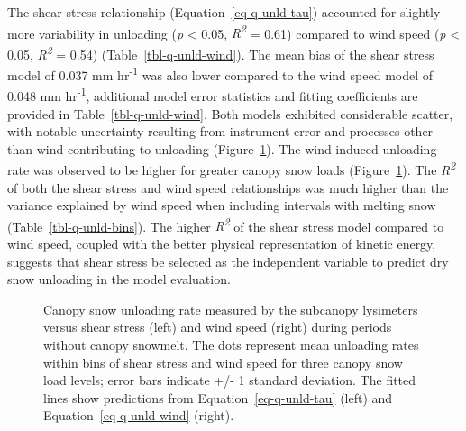 \documentclass[
]{agujournal2019}
\makeatletter
\newcommand*\pandocbounded[1]{%
  \sbox\pandoc@box{#1}%
  \Gscale@div\@tempa{\textheight}{\dimexpr\ht\pandoc@box+\dp\pandoc@box\relax}%
  \Gscale@div\@tempb{\linewidth}{\wd\pandoc@box}%
  \ifdim\@tempb\p@<\@tempa\p@\let\@tempa\@tempb\fi%
  \ifdim\@tempa\p@<\p@\scalebox{\@tempa}{\usebox\pandoc@box}%
  \else\usebox{\pandoc@box}%
  \fi%
}
\makeatother
\begin{document}
The shear stress relationship (Equation~\ref{eq-q-unld-tau}) accounted
for slightly more variability in unloading (\emph{p} \textless{} 0.05,
\emph{R\textsuperscript{2}} = 0.61) compared to wind speed (\emph{p}
\textless{} 0.05, \emph{R\textsuperscript{2}} = 0.54)
(Table~\ref{tbl-q-unld-wind}). The mean bias of the shear stress model
of 0.037 mm hr\textsuperscript{-1} was also lower compared to the wind
speed model of 0.048 mm hr\textsuperscript{-1}, additional model error
statistics and fitting coefficients are provided in
Table~\ref{tbl-q-unld-wind}. Both models exhibited considerable scatter,
with notable uncertainty resulting from instrument error and processes
other than wind contributing to unloading
(Figure~\ref{fig-q-unld-wind}). The wind-induced unloading rate was
observed to be higher for greater canopy snow loads
(Figure~\ref{fig-q-unld-wind}). The \emph{R\textsuperscript{2}} of both
the shear stress and wind speed relationships was much higher than the
variance explained by wind speed when including intervals with melting
snow (Table~\ref{tbl-q-unld-bins}). The higher
\emph{R\textsuperscript{2}} of the shear stress model compared to wind
speed, coupled with the better physical representation of kinetic
energy, suggests that shear stress be selected as the independent
variable to predict dry snow unloading in the model evaluation.

\begin{figure}[htbp]

\centering{

\pandocbounded{\texttt{[image: figs/final/figure5.png]}}

}

\caption{\label{fig-q-unld-wind}Canopy snow unloading rate measured by
the subcanopy lysimeters versus shear stress (left) and wind speed
(right) during periods without canopy snowmelt. The dots represent mean
unloading rates within bins of shear stress and wind speed for three
canopy snow load levels; error bars indicate +/- 1 standard deviation.
The fitted lines show predictions from Equation~\ref{eq-q-unld-tau}
(left) and Equation~\ref{eq-q-unld-wind} (right).}

\end{figure}%
\end{document}
